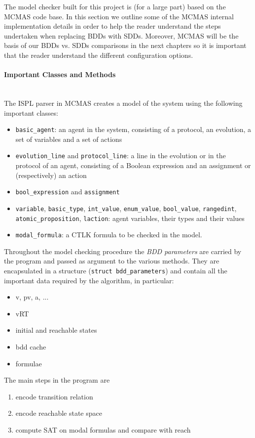 \documentclass[12]{article}
\newcommand{\myparagraph}[1]{\paragraph{#1}\mbox{}\\}
\begin{document}
The model checker built for this project is (for a large part) based on the MCMAS code base. In this section we outline some of the MCMAS internal implementation details in order to help the reader understand the steps undertaken when replacing BDDs with SDDs. Moreover, MCMAS will be the basis of our BDDs vs. SDDs comparisons in the next chapters so it is important that the reader understand the different configuration options.

\myparagraph{Important Classes and Methods}

The ISPL parser in MCMAS creates a model of the system using the following important classes: 
\begin{itemize}
\item \texttt{basic\_agent}: an agent in the system, consisting of a protocol, an evolution, a set of variables and a set of actions
\item \texttt{evolution\_line} and \texttt{protocol\_line}: a line in the evolution or in the protocol of an agent, consisting of a Boolean expression and an assignment or (respectively) an action
\item \texttt{bool\_expression} and \texttt{assignment}
\item \texttt{variable}, \texttt{basic\_type}, \texttt{int\_value}, \texttt{enum\_value}, \texttt{bool\_value},  \texttt{rangedint}, \texttt{atomic\_proposition}, \texttt{laction}: agent variables, their types and their values
\item \texttt{modal\_formula}: a CTLK formula to be checked in the model.
\end{itemize}
Throughout the model checking procedure the \textit{BDD parameters} are carried by the program and passed as argument to the various methods. They are encapsulated in a structure (\texttt{struct bdd\_parameters}) and contain all the important data required by the algorithm, in particular: 
\begin{itemize}
\item v, pv, a, ...
\item vRT
\item initial and reachable states
\item bdd cache
\item formulae
\end{itemize}
The main steps in the program are 
\begin{enumerate}
\item encode transition relation 
\item encode reachable state space
\item compute SAT on modal formulas and compare with reach
\end{enumerate}
\end{document}
